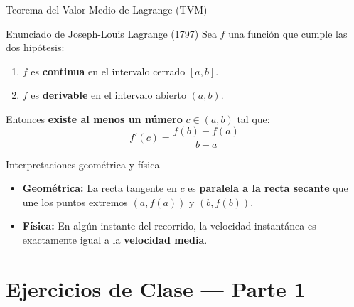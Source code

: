 \documentclass[aspectratio=169]{beamer}
\begin{document}
\begin{frame}{Teorema del Valor Medio de Lagrange (TVM)}
  \begin{block}{Enunciado de Joseph-Louis Lagrange (1797)}
    Sea $f$ una función que cumple las dos hipótesis:
    \begin{enumerate}
      \item $f$ es \textbf{continua} en el intervalo cerrado $[a, b]$.
      \item $f$ es \textbf{derivable} en el intervalo abierto $(a, b)$.
    \end{enumerate}
    Entonces \textbf{existe al menos un número} $c \in (a, b)$ tal que:
    $$\boxed{f'(c) = \frac{f(b) - f(a)}{b - a}}$$
  \end{block}

  \vspace{4pt}
  \begin{block}{Interpretaciones geométrica y física}
    \begin{itemize}
      \item \textbf{Geométrica:} La recta tangente en $c$ es \textbf{paralela a la recta secante} que une los puntos extremos $(a, f(a))$ y $(b, f(b))$.
      \item \textbf{Física:} En algún instante del recorrido, la velocidad instantánea es exactamente igual a la \textbf{velocidad media}.
    \end{itemize}
  \end{block}
\end{frame}



\section{Ejercicios de Clase — Parte 1}
\end{document}
